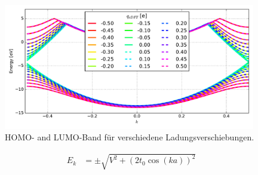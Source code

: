 \begin{frame}
\begin{figure}
\centering
\includegraphics[width = 11cm]{Images/Hydrogen/charging/band_structure_q_1}
\caption{HOMO- and LUMO-Band für verschiedene Ladungsverschiebungen.}
\label{image_hydrogen_charged_bands}
\end{figure}
\begin{align*}
E_k &= \pm \sqrt{V^2 + \left(2t_0\cos(ka)\right)^2}
\end{align*}
\end{frame}

